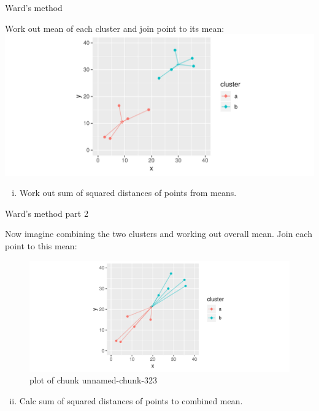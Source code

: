 \documentclass[ignorenonframetext,]{beamer}
\providecommand{\tightlist}{%
  \setlength{\itemsep}{0pt}\setlength{\parskip}{0pt}}
\begin{document}
\begin{frame}{Ward's method}
\protect\hypertarget{wards-method}{}

Work out mean of each cluster and join point to its mean:
\includegraphics{figure/unnamed-chunk-322-1.pdf}

\begin{enumerate}
[(i)]
\tightlist
\item
  Work out sum of squared distances of points from means.
\end{enumerate}

\end{frame}

\begin{frame}{Ward's method part 2}
\protect\hypertarget{wards-method-part-2}{}

Now imagine combining the two clusters and working out overall mean.
Join each point to this mean:

\begin{figure}
\centering
\includegraphics{figure/unnamed-chunk-323-1.pdf}
\caption{plot of chunk unnamed-chunk-323}
\end{figure}

\begin{enumerate}
[(i)]
\setcounter{enumi}{1}
\tightlist
\item
  Calc sum of squared distances of points to combined mean.
\end{enumerate}

\end{frame}
\end{document}
